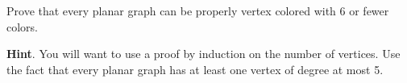 \documentclass{book}
\begin{document}
\setcounter{cpjt}{38}
\addtocounter{cpjt}{-1}
\begin{activity}\label{activity-31}
\hypertarget{p-349}{}%
Prove that every planar graph can be properly vertex colored with 6 or fewer colors.%
\par\smallskip%
\noindent\textbf{Hint}.\hypertarget{hint-11}{}\quad%
\hypertarget{p-350}{}%
You will want to use a proof by induction on the number of vertices.  Use the fact that every planar graph has at least one vertex of degree at most 5.%
\end{activity}

\clearpage
\end{document}
